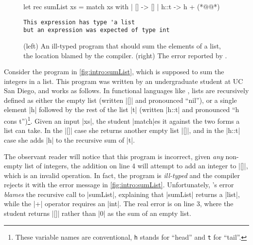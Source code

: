 \begin{figure}[t]
\small
\begin{minipage}{0.45\linewidth}
\begin{ecode}
let rec sumList xs =
  match xs with
  | []   -> []
  | h::t -> h + (*@@*)
\end{ecode}
\end{minipage}
\begin{minipage}{0.5\linewidth}
\begin{verbatim}
This expression has type 'a list
but an expression was expected of type int
\end{verbatim}
\end{minipage}
\caption{(left) An ill-typed \ocaml program that should sum the elements of a
  list,  the location blamed by the \ocaml compiler.
  (right) The error reported by \ocaml.}
\label{fig:intro:sumList}
\end{figure}

Consider the \ocaml program in \autoref{fig:intro:sumList}, which is
supposed to sum the integers in a list.
%
This program was written by an undergraduate student at UC San Diego,
and works as follows.
%
In functional languages like \ocaml, lists are recursively defined as
either the empty list (written |[]| and pronounced ``nil''), or a single
element |h| followed by the rest of the list |t| (written |h::t| and
pronounced ``h cons t'')\footnote{These variable names are conventional,
  \texttt{h} stands for ``head'' and \texttt{t} for ``tail''.}.
%
Given an input |xs|, the student |match|es it against the
two forms a list can take.
%
In the |[]| case she returns another empty list |[]|, and in the
|h::t| case she adds |h| to the recursive sum of |t|.

The observant reader will notice that this program is incorrect, given
\emph{any} non-empty list of integers, the addition on line 4 will
attempt to add an integer to |[]|, which is an invalid operation.
%
In fact, the program is \emph{ill-typed} and the \ocaml compiler rejects
it with the error message in \autoref{fig:intro:sumList}.
%
Unfortunately, \ocaml's error \emph{blames} the recursive call to
|sumList|, explaining that |sumList| returns a |list|, while the |+|
operator requires an |int|.
%
The real error is on line 3, where the student returns |[]| rather than
|0| as the sum of an empty list.

